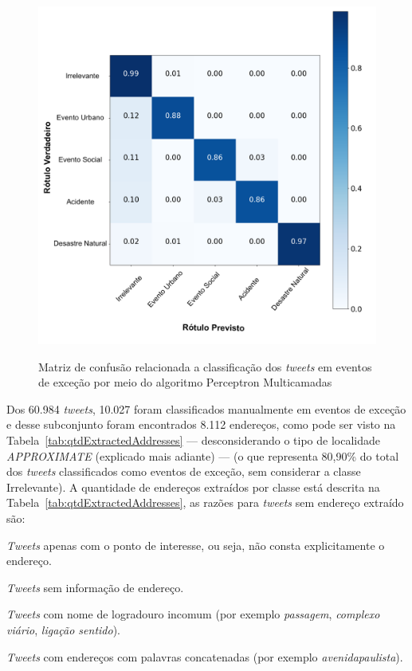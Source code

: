 \documentclass[
	12pt,				%
	oneside,			%
	a4paper,			%
	english,			%
	brazil				%
	]{abntex2ppgsi}
\begin{document}
{{\begin{figure}[!htb]
	\centering
 	  \caption{Matriz de confusão relacionada a classificação dos \textit{tweets} em eventos de exceção por meio do algoritmo Perceptron Multicamadas}
		\includegraphics[width=1\linewidth]{images/confusion_matrix_mlp_pt.png}
	\label{fig:confusion_matrix_mlp}
\end{figure}

Dos 60.984 \textit{tweets}, 10.027 foram classificados manualmente em eventos de exceção e desse subconjunto foram encontrados 8.112 endereços, como pode ser visto na Tabela~\ref{tab:qtdExtractedAddresses} --- desconsiderando o tipo de localidade \textit{APPROXIMATE} (explicado mais adiante) --- (o que representa 80,90\% do total dos \textit{tweets} classificados como eventos de exceção, sem considerar a classe Irrelevante). A quantidade de endereços extraídos por classe está descrita na Tabela~\ref{tab:qtdExtractedAddresses}, as razões para \textit {tweets} sem endereço extraído são:

\begin{enumerate*}
\item \textit{Tweets} apenas com o ponto de interesse, ou seja, não consta explicitamente o endereço.
\item \textit{Tweets} sem informação de endereço.
\item \textit{Tweets} com nome de logradouro incomum (por exemplo \emph{passagem}, \emph{complexo viário}, \emph{ligação sentido}).
\item \textit{Tweets} com endereços com palavras concatenadas (por exemplo \emph{avenidapaulista}).
\end{enumerate*}

}}
\end{document}
